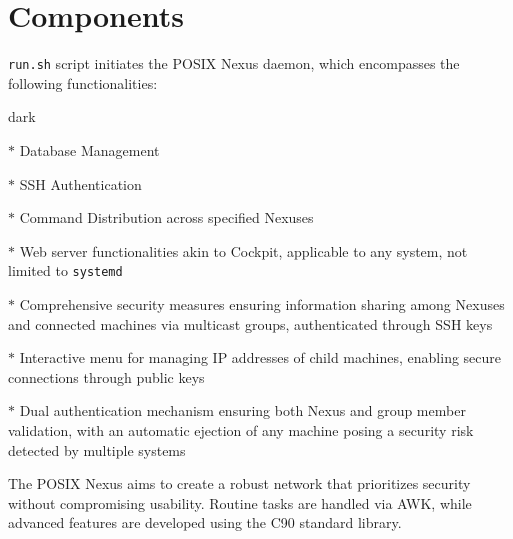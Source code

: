 \section{Components}
\texttt{run.sh} script initiates the POSIX Nexus daemon, which encompasses the following functionalities:
\bigskip
\begin{baseBoxOne}{}{dark}
    \begin{posnexItemize}
        \item[$\ast$] Database Management
        \item[$\ast$] SSH Authentication
        \item[$\ast$] Command Distribution across specified Nexuses
        \item[$\ast$] Web server functionalities akin to Cockpit, applicable to any system, not limited to \texttt{systemd}
        \item[$\ast$] Comprehensive security measures ensuring information sharing among Nexuses and connected machines via multicast groups, authenticated through SSH keys
        \item[$\ast$] Interactive menu for managing IP addresses of child machines, enabling secure connections through public keys
        \item[$\ast$] Dual authentication mechanism ensuring both Nexus and group member validation, with an automatic ejection of any machine posing a security risk detected by multiple systems
    \end{posnexItemize}
\end{baseBoxOne}
\bigskip
The POSIX Nexus aims to create a robust network that prioritizes security without compromising usability. Routine tasks are handled via AWK, while advanced features are developed using the C90 standard library.


%
%
